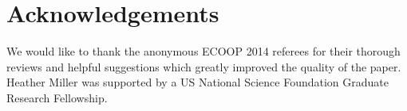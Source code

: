 \documentclass[runningheads]{llncs}
\begin{document}
\begin{sloppypar}

\section*{Acknowledgements}

We would like to thank the anonymous ECOOP 2014 referees for their thorough
reviews and helpful suggestions which greatly improved the quality of the
paper. Heather Miller was supported by a US National Science Foundation
Graduate Research Fellowship.




\end{sloppypar}
\end{document}
